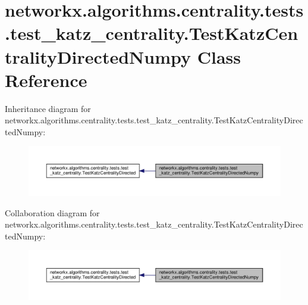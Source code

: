 \hypertarget{classnetworkx_1_1algorithms_1_1centrality_1_1tests_1_1test__katz__centrality_1_1TestKatzCentralityDirectedNumpy}{}\section{networkx.\+algorithms.\+centrality.\+tests.\+test\+\_\+katz\+\_\+centrality.\+Test\+Katz\+Centrality\+Directed\+Numpy Class Reference}
\label{classnetworkx_1_1algorithms_1_1centrality_1_1tests_1_1test__katz__centrality_1_1TestKatzCentralityDirectedNumpy}


Inheritance diagram for networkx.\+algorithms.\+centrality.\+tests.\+test\+\_\+katz\+\_\+centrality.\+Test\+Katz\+Centrality\+Directed\+Numpy\+:
\nopagebreak
\begin{figure}[H]
\begin{center}
\leavevmode
\includegraphics[width=350pt]{classnetworkx_1_1algorithms_1_1centrality_1_1tests_1_1test__katz__centrality_1_1TestKatzCentralityDirectedNumpy__inherit__graph}
\end{center}
\end{figure}


Collaboration diagram for networkx.\+algorithms.\+centrality.\+tests.\+test\+\_\+katz\+\_\+centrality.\+Test\+Katz\+Centrality\+Directed\+Numpy\+:
\nopagebreak
\begin{figure}[H]
\begin{center}
\leavevmode
\includegraphics[width=350pt]{classnetworkx_1_1algorithms_1_1centrality_1_1tests_1_1test__katz__centrality_1_1TestKatzCentralityDirectedNumpy__coll__graph}
\end{center}
\end{figure}
